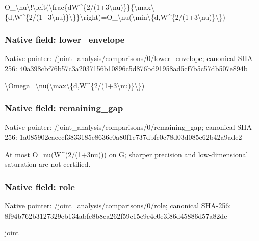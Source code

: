\documentclass[10pt,a4paper]{article}
\begin{document}
\begingroup\raggedright\sloppy O\_\allowbreak{}\textbackslash{}nu\textbackslash{}!\textbackslash{}left(\textbackslash{}frac\{dW\textasciicircum{}\{2/\allowbreak{}(1+3\textbackslash{}nu)\}\}\{\textbackslash{}max\textbackslash{}\{d,\allowbreak{}W\textasciicircum{}\{2/\allowbreak{}(1+3\textbackslash{}nu)\}\textbackslash{}\}\}\textbackslash{}right)=\allowbreak{}O\_\allowbreak{}\textbackslash{}nu(\textbackslash{}min\textbackslash{}\{d,\allowbreak{}W\textasciicircum{}\{2/\allowbreak{}(1+3\textbackslash{}nu)\}\textbackslash{}\})\par\endgroup

\subsubsection{Native field: lower\_\allowbreak{}envelope}
Native pointer: /joint\_\allowbreak{}analysis/comparisons/0/lower\_\allowbreak{}envelope; canonical SHA-256: 40a398cbf76b57c3a2037156b10896c5d876bd91958ad5cf7b5c57db507e894b

\begingroup\raggedright\sloppy \textbackslash{}Omega\_\allowbreak{}\textbackslash{}nu(\textbackslash{}max\textbackslash{}\{d,\allowbreak{}W\textasciicircum{}\{2/\allowbreak{}(1+3\textbackslash{}nu)\}\textbackslash{}\})\par\endgroup

\subsubsection{Native field: remaining\_\allowbreak{}gap}
Native pointer: /joint\_\allowbreak{}analysis/comparisons/0/remaining\_\allowbreak{}gap; canonical SHA-256: 1a085902eaeecf3833185e8636e0a80f1c737dbfc0c78d03d085c62b42a9ade2

\begingroup\raggedright\sloppy At most O\_\allowbreak{}nu(W\textasciicircum{}(2/\allowbreak{}(1+3nu))) on G;\allowbreak{} sharper precision and low-dimensional saturation are not certified.\par\endgroup

\subsubsection{Native field: role}
Native pointer: /joint\_\allowbreak{}analysis/comparisons/0/role; canonical SHA-256: 8f94b762b3127329eb134abfe8b8ca262f59c15e9c4e0e3f86d45886d57a82de

\begingroup\raggedright\sloppy joint\par\endgroup
\end{document}
